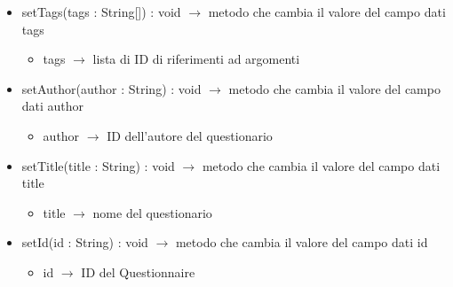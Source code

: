\begin{description}
\begin{itemize}
	\item setTags(tags : String[]) : void $\rightarrow$ metodo che cambia il valore del campo dati tags\begin{itemize}
		\item tags $\rightarrow$ lista di ID di riferimenti ad argomenti 
	\end{itemize}
	
	\item setAuthor(author : String) : void $\rightarrow$ metodo che cambia il valore del campo dati author\begin{itemize}
		\item author $\rightarrow$ ID dell'autore del questionario
	\end{itemize}
	
	\item setTitle(title : String) : void $\rightarrow$ metodo che cambia il valore del campo dati title\begin{itemize}
		\item title $\rightarrow$ nome del questionario
	\end{itemize}
	
	\item setId(id : String) : void $\rightarrow$ metodo che cambia il valore del campo dati id\begin{itemize}
		\item id $\rightarrow$ ID del Questionnaire
	\end{itemize}
	
\end{itemize}

\end{description}


